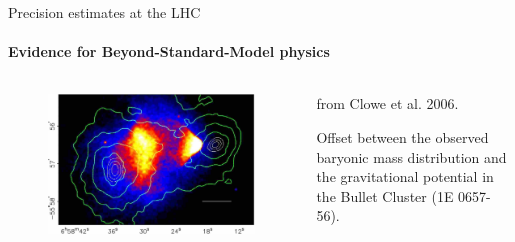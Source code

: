 
\begin{frame}{Precision estimates at the LHC}
  \framesubtitle{Evidence for Beyond-Standard-Model physics}

  \begin{columns}

    \begin{column}{0.5\textwidth}

      \vspace{-2em}

      \begin{columns}

        \begin{column}{0.5\textwidth}
          \begin{figure}
            \centering
            \includegraphics[width = 1.15 \textwidth]{imgs/clowe-2.png}
          \end{figure}
        \end{column}

        \begin{column}{0.5\textwidth}
          \scriptsize {} from Clowe et al. 2006.

          \justifying
          \scriptsize Offset between the observed baryonic mass distribution and the gravitational potential in the Bullet Cluster (1E 0657-56).
        \end{column}

      \end{columns}

      \vspace{0.5em}


\end{column}
\end{columns}
\end{frame}
